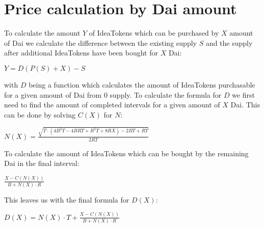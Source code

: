 \documentclass[12pt]{article}
\begin{document}
\section{Price calculation by Dai amount}
To calculate the amount $Y$ of IdeaTokens which can be purchased by $X$ amount of Dai we calculate the difference between the existing supply $S$ and the supply after additional IdeaTokens have been bought for $X$ Dai:
\begin{center}
$Y = D(P(S) + X) - S$
\end{center}
with $D$ being a function which calculates the amount of IdeaTokens purchasable for a given amount of Dai from $0$ supply. To calculate the formula for $D$ we first need to find the amount of completed intervals for a given amount of $X$ Dai. This can be done by solving $C(X)$ for $N$:
\begin{center}
$N(X) = \frac{\sqrt{T \cdot (4B^2T - 4BRT + R^2T + 8RX) - 2BT + RT}}{2RT}$
\end{center}
To calculate the amount of IdeaTokens which can be bought by the remaining Dai in the final interval:
\begin{center}
$\frac{X - C(N(X))}{B + N(X) \cdot R}$
\end{center}
This leaves us with the final formula for $D(X)$:
\begin{center}
$D(X) = N(X) \cdot T + \frac{X - C(N(X))}{B + N(X) \cdot R}$
\end{center}
\end{document}
